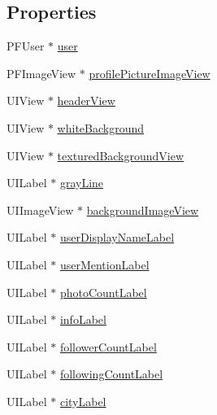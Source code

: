 \subsection*{Properties}
\begin{DoxyCompactItemize}
\item 
P\+F\+User $\ast$ \hyperlink{interface_e_s_account_view_controller_a12dd221f20006835f1a50142b25c4eaa}{user}
\item 
P\+F\+Image\+View $\ast$ \hyperlink{interface_e_s_account_view_controller_ab114efbbc510453ce53da7d275ec3c39}{profile\+Picture\+Image\+View}
\item 
U\+I\+View $\ast$ \hyperlink{interface_e_s_account_view_controller_a2d504efdc18c9ce1f2fc5970499f21c4}{header\+View}
\item 
U\+I\+View $\ast$ \hyperlink{interface_e_s_account_view_controller_ab6fc1d6fc319a61b4753414db9e2be7f}{white\+Background}
\item 
U\+I\+View $\ast$ \hyperlink{interface_e_s_account_view_controller_a03f4ceb81b14e54d7389cb80e83478a2}{textured\+Background\+View}
\item 
U\+I\+Label $\ast$ \hyperlink{interface_e_s_account_view_controller_acada7b03b8f32038376047f77f3e5896}{gray\+Line}
\item 
U\+I\+Image\+View $\ast$ \hyperlink{interface_e_s_account_view_controller_a7c7745ad5fc51771d720bc0905336c10}{background\+Image\+View}
\item 
U\+I\+Label $\ast$ \hyperlink{interface_e_s_account_view_controller_a4a3855adf0046a8e3d02466778099df2}{user\+Display\+Name\+Label}
\item 
U\+I\+Label $\ast$ \hyperlink{interface_e_s_account_view_controller_a2c6e65c3ac71a2af27f3f3bb05d1b757}{user\+Mention\+Label}
\item 
U\+I\+Label $\ast$ \hyperlink{interface_e_s_account_view_controller_a080c2273f8f89aa0eae603f86eb527d2}{photo\+Count\+Label}
\item 
U\+I\+Label $\ast$ \hyperlink{interface_e_s_account_view_controller_a82b57173e362024e4bcc76e91ab0d18c}{info\+Label}
\item 
U\+I\+Label $\ast$ \hyperlink{interface_e_s_account_view_controller_a0590250432e7b3f86b75b16acd20f3d9}{follower\+Count\+Label}
\item 
U\+I\+Label $\ast$ \hyperlink{interface_e_s_account_view_controller_a8b207ff2e2ff1dd28d9524e9ef1c8283}{following\+Count\+Label}
\item 
U\+I\+Label $\ast$ \hyperlink{interface_e_s_account_view_controller_a9c2190bbe27cdc3977d8da6074b42f8b}{city\+Label}

\end{DoxyCompactItemize}
